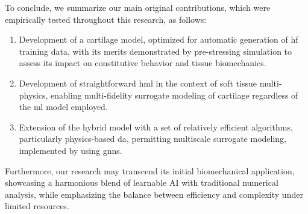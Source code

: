 To conclude, we summarize our main original contributions, which were empirically tested throughout this research, as follows:
%
\begin{enumerate}
    \item Development of a cartilage model, optimized for automatic generation of \ac{hf} training data, with its merits demonstrated by pre-stressing simulation to assess its impact on constitutive behavior and tissue biomechanics.
    \item Development of straightforward \ac{hml} in the context of soft tissue multi-physics, enabling multi-fidelity surrogate modeling of cartilage regardless of the \ac{ml} model employed.
    \item Extension of the hybrid model with a set of relatively efficient algorithms, particularly physics-based \ac{da}, permitting multiscale surrogate modeling, implemented by using \acp{gnn}.
\end{enumerate}
%
Furthermore, our research may transcend its initial biomechanical application, showcasing a harmonious blend of learnable AI with traditional numerical analysis, while emphasizing the balance between efficiency and complexity under limited resources.

\printbibliography[title={References}, heading=bibintoc]


